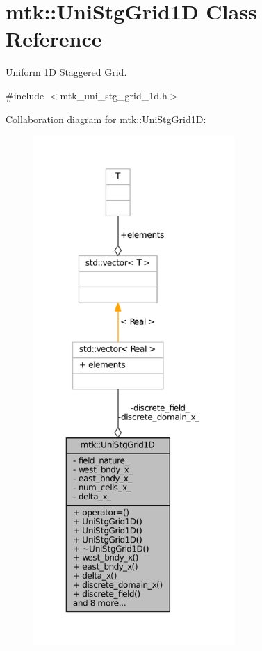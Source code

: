 \hypertarget{classmtk_1_1UniStgGrid1D}{\section{mtk\+:\+:Uni\+Stg\+Grid1\+D Class Reference}
\label{classmtk_1_1UniStgGrid1D}
}


Uniform 1\+D Staggered Grid.  




{\ttfamily \#include $<$mtk\+\_\+uni\+\_\+stg\+\_\+grid\+\_\+1d.\+h$>$}



Collaboration diagram for mtk\+:\+:Uni\+Stg\+Grid1\+D\+:
\nopagebreak
\begin{figure}[H]
\begin{center}
\leavevmode
\includegraphics[height=550pt]{classmtk_1_1UniStgGrid1D__coll__graph}
\end{center}
\end{figure}
